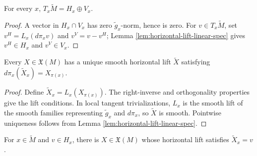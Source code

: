 \begin{lemma}
\label{lem:tangent-space-horizontal-vertical-splitting}
\leanok
{}
For every $x$, $T_x\tilde M=H_x\oplus V_x$.
\end{lemma}

\begin{proof}
\leanok
{}
\sketch A vector in $H_x\cap V_x$ has zero $\tilde g_x$-norm, hence is zero. For $v\in T_x\tilde M$, set $v^H=L_x(d\pi_xv)$ and $v^V=v-v^H$; Lemma \ref{lem:horizontal-lift-linear-spec} gives $v^H\in H_x$ and $v^V\in V_x$.
\end{proof}

\begin{proposition}
\label{prop:horizontal-lift-of-vector-field}
\leanok
{}
Every $X\in\mathfrak X(M)$ has a unique smooth horizontal lift $\tilde X$ satisfying $d\pi_x(\tilde X_x)=X_{\pi(x)}$.
\end{proposition}

\begin{proof}
\leanok
{}
\sketch Define $\tilde X_x=L_x(X_{\pi(x)})$. The right-inverse and orthogonality properties give the lift conditions. In local tangent trivializations, $L_x$ is the smooth lift of the smooth families representing $\tilde g_x$ and $d\pi_x$, so $\tilde X$ is smooth. Pointwise uniqueness follows from Lemma \ref{lem:horizontal-lift-linear-spec}.
\end{proof}

\begin{proposition}
\label{prop:horizontal-lift-realizes-horizontal-vector}
\leanok
{}
For $x\in\tilde M$ and $v\in H_x$, there is $X\in\mathfrak X(M)$ whose horizontal lift satisfies $\tilde X_x=v$.
\end{proposition}

